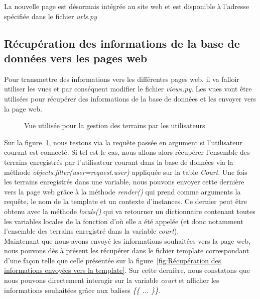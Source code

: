 
La nouvelle page est désormais intégrée au site web et est disponible à l'adresse spécifiée dans le fichier \textit{urls.py}

\subsection{Récupération des informations de la base de données vers les pages web}

Pour transmettre des informations vers les différentes pages web, il va falloir utiliser les vues et par conséquent modifier le fichier \textit{views.py}. Les vues vont être utilisées pour récupérer des informations de la base de données et les envoyer vers la page web.

\begin{figure}[!ht]
\centering
\begin{framed}

\end{framed}
\caption{Vue utilisée pour la gestion des terrains par les utilisateurs}
\label{fig:Vue utilisée pour la gestion des terrains par les utilisateurs}
\end{figure}
\FloatBarrier

Sur la figure~\ref{fig:Vue utilisée pour la gestion des terrains par les utilisateurs}, nous testons via la requête passée en argument si l'utilisateur courant est connecté. Si tel est le cas, nous allons alors récupérer l'ensemble des terrains enregistrés par l'utilisateur courant dans la base de données via la méthode \textit{objects.filter(user=request.user)} appliquée sur la table \textit{Court}. Une fois les terrains enregistrés dans une variable, nous pouvons envoyer cette dernière vers la page web grâce à la méthode \textit{render()} qui prend comme arguments la requête, le nom de la template et un contexte d'instances. Ce dernier peut être obtenu avec la méthode \textit{locals()} qui va retourner un dictionnaire contenant toutes les variables locales de la fonction d'où elle a été appelée (et donc notamment l'ensemble des terrains enregistré dans la variable \textit{court}).\\

Maintenant que nous avons envoyé les informations souhaitées vers la page web, nous pouvons dès à présent les récupérer dans le fichier template correspondant d'une façon telle que celle présentée sur la figure~\ref{fig:Récupération des informations envoyées vers la template}. Sur cette dernière, nous constatons que nous pouvons directement interagir sur la variable \textit{court} et afficher les informations souhaitées grâce aux balises \textit{\{\{ ... \}\}}.

